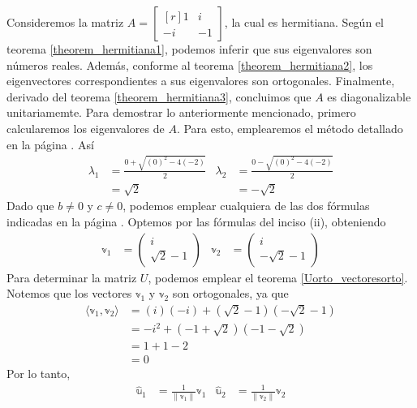 \begin{example}
    Consideremos la matriz $A = \begin{bmatrix*}[r]
        1 & i \\
        -i & -1
    \end{bmatrix*}$, la cual es hermitiana. Según el teorema \ref{theorem_hermitiana1}, podemos inferir que sus eigenvalores son números reales. Además, conforme al teorema \ref{theorem_hermitiana2}, los eigenvectores correspondientes a sus eigenvalores son ortogonales. Finalmente, derivado del teorema \ref{theorem_hermitiana3}, concluimos que $A$ es diagonalizable unitariamemte. Para demostrar lo anteriormente mencionado, primero calcularemos los eigenvalores de $A$. Para esto, emplearemos el método detallado en la página \pageref{metodo_eigen_2x2}. Así
    \begin{align*}
        \lambda_1 & = \frac{0 + \sqrt{(0)^2 - 4(-2)}}{2} & \lambda_2 & = \frac{0 - \sqrt{(0)^2 - 4(-2)}}{2} \\
        & = \sqrt{2} & & = -\sqrt{2}
    \end{align*}
    Dado que $b \neq 0$ y $c \neq 0$, podemos emplear cualquiera de las dos fórmulas indicadas en la página \pageref{metodo_eigen_2x2}. Optemos por las fórmulas del inciso (ii), obteniendo
    \begin{align*}
        \mathbb{v}_1 & = \begin{pmatrix} i \\ \sqrt{2} - 1 \end{pmatrix} & \mathbb{v}_2 & = \begin{pmatrix} i \\ - \sqrt{2} - 1 \end{pmatrix}
    \end{align*}
    Para determinar la matriz $U$, podemos emplear el teorema \ref{Uorto_vectoresorto}. Notemos que los vectores $\mathbb{v}_1$ y $\mathbb{v}_2$ son ortogonales, ya que
    \begin{align*}
        \langle \mathbb{v}_1, \mathbb{v}_2 \rangle & = (i)(-i) + (\sqrt{2} - 1)(- \sqrt{2} - 1) \\
        & = - i^2 + (- 1 + \sqrt{2})(- 1 - \sqrt{2}) \\
        & = 1 + 1 - 2 \\
        & = 0
    \end{align*}
    Por lo tanto,
    \begin{align*}
        \hat{\mathbb{u}}_1 & = \frac{1}{\| \mathbb{v}_1 \|} \mathbb{v}_1 & \hat{\mathbb{u}}_2 & = \frac{1}{\| \mathbb{v}_2 \|} \mathbb{v}_2 \\

\end{align*}
\end{example}
